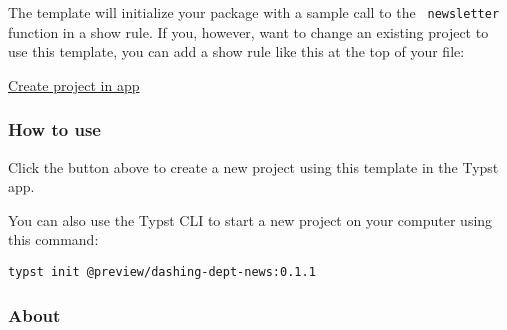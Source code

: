The template will initialize your package with a sample call to the
\texttt{\ newsletter\ } function in a show rule. If you, however, want
to change an existing project to use this template, you can add a show
rule like this at the top of your file:

\begin{Shaded}
\begin{Highlighting}[]
\NormalTok{  edition: [}
\NormalTok{  ],}
\NormalTok{  ),}
\NormalTok{  publication{-}info: [}
\NormalTok{  ],}
\NormalTok{)}

\end{Highlighting}
\end{Shaded}

\href{/app?template=dashing-dept-news&version=0.1.1}{Create project in
app}

\subsubsection{How to use}\label{how-to-use}

Click the button above to create a new project using this template in
the Typst app.

You can also use the Typst CLI to start a new project on your computer
using this command:

\begin{verbatim}
typst init @preview/dashing-dept-news:0.1.1
\end{verbatim}



\subsubsection{About}\label{about}

